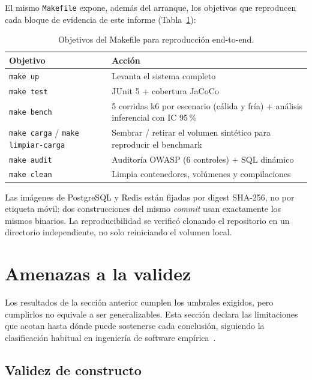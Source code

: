 \documentclass[11pt,a4paper]{article}
\begin{document}
El mismo \texttt{Makefile} expone, además del arranque, los objetivos
que reproducen cada bloque de evidencia de este informe
(Tabla~\ref{tab:makefile-objetivos}):

\begin{table}[htbp]
\centering
\caption{Objetivos del Makefile para reproducción end-to-end.}
\label{tab:makefile-objetivos}
\begin{tabular}{@{}ll@{}}
\toprule
\textbf{Objetivo} & \textbf{Acción} \\
\midrule
\texttt{make up} & Levanta el sistema completo \\
\texttt{make test} & JUnit 5 + cobertura JaCoCo \\
\texttt{make bench} & 5 corridas k6 por escenario (cálida y fría) + análisis inferencial con IC 95\,\% \\
\texttt{make carga} / \texttt{make limpiar-carga} & Sembrar / retirar el volumen sintético para reproducir el benchmark \\
\texttt{make audit} & Auditoría OWASP (6 controles) + SQL dinámico \\
\texttt{make clean} & Limpia contenedores, volúmenes y compilaciones \\
\bottomrule
\end{tabular}
\end{table}

Las imágenes de PostgreSQL y Redis están fijadas por digest SHA-256, no por
etiqueta móvil: dos construcciones del mismo \emph{commit} usan exactamente
los mismos binarios. La reproducibilidad se verificó clonando el repositorio
en un directorio independiente, no solo reiniciando el volumen local.

\section{Amenazas a la validez}
\label{sec:amenazas}

Los resultados de la sección anterior cumplen los umbrales exigidos, pero
cumplirlos no equivale a ser generalizables. Esta sección declara las
limitaciones que acotan hasta dónde puede sostenerse cada conclusión,
siguiendo la clasificación habitual en ingeniería de software
empírica~\cite{iso25010}.

\subsection{Validez de constructo}
\end{document}
